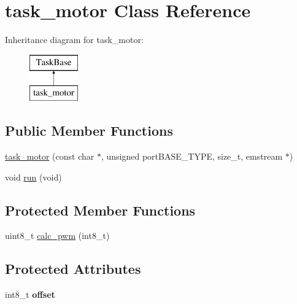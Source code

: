\hypertarget{classtask__motor}{}\section{task\+\_\+motor Class Reference}
\label{classtask__motor}
Inheritance diagram for task\+\_\+motor\+:\begin{figure}[H]
\begin{center}
\leavevmode
\includegraphics[height=2.000000cm]{classtask__motor}
\end{center}
\end{figure}
\subsection*{Public Member Functions}
\begin{DoxyCompactItemize}
\item 
\mbox{\hyperlink{classtask__motor_a6ed0a0b463e698d636b28bcdd518a027}{task\+\_\+motor}} (const char $\ast$, unsigned port\+B\+A\+S\+E\+\_\+\+T\+Y\+PE, size\+\_\+t, emstream $\ast$)
\item 
void \mbox{\hyperlink{classtask__motor_a895a075ec470c9d5a07b8959de06aacd}{run}} (void)
\end{DoxyCompactItemize}
\subsection*{Protected Member Functions}
\begin{DoxyCompactItemize}
\item 
uint8\+\_\+t \mbox{\hyperlink{classtask__motor_a6022366bdc25c0a1c16b96bbc02bcffa}{calc\+\_\+pwm}} (int8\+\_\+t)
\end{DoxyCompactItemize}
\subsection*{Protected Attributes}
\begin{DoxyCompactItemize}
\item 
\mbox{\label{classtask__motor_a7ccbea1fe01e35b055688cca8b5be8f0}} 
int8\+\_\+t {\bfseries offset}
\end{DoxyCompactItemize}


